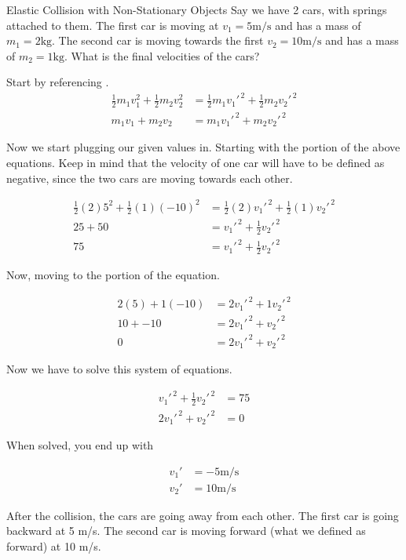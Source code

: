 \begin{example}[]{Elastic Collision with Non-Stationary Objects}
  Say we have 2 cars, with springs attached to them.
  The first car is moving at $v_{1} = 5 \si{\meter / \second}$ and has a mass of $m_{1} = 2 \si{\kilo \gram}$.
  The second car is moving towards the first $v_{2} = 10 \si{\meter / \second}$ and has a mass of $m_{2} = 1 \si{\kilo \gram}$.
  What is the final velocities of the cars?

  \tcblower

  Start by referencing .
  \begin{align*}
    \frac{1}{2} m_{1} v_{1}^{2} + \frac{1}{2} m_{2} v_{2}^{2} &= \frac{1}{2} m_{1} v_{1}'^{\,2} + \frac{1}{2} m_{2} v_{2}'^{\,2} \\
    m_{1} v_{1} + m_{2} v_{2} &= m_{1} v_{1}'^{\,2} + m_{2} v_{2}'^{\,2}
  \end{align*}

  Now we start plugging our given values in.
  Starting with the  portion of the above equations.
  Keep in mind that the velocity of one car will have to be defined as negative, since the two cars are moving towards each other.

  \begin{align*}
    \frac{1}{2} (2) 5^{2} + \frac{1}{2} (1) (-10)^{2} &= \frac{1}{2} (2) v_{1}'^{\,2} + \frac{1}{2} (1) v_{2}'^{\,2} \\
    25 + 50 &= v_{1}'^{\,2} + \frac{1}{2} v_{2}'^{\,2} \\
    75 &= v_{1}'^{\,2} + \frac{1}{2} v_{2}'^{\,2}
  \end{align*}

  Now, moving to the  portion of the equation.

  \begin{align*}
    2 (5) + 1 (-10) &= 2 v_{1}'^{\,2} + 1 v_{2}'^{\,2} \\
    10 + -10 &= 2 v_{1}'^{\,2} + v_{2}'^{\,2} \\
    0 &= 2 v_{1}'^{\,2} + v_{2}'^{\,2}
  \end{align*}

  Now we have to solve this system of equations.

  \begin{align*}
    v_{1}'^{\,2} + \frac{1}{2} v_{2}'^{\,2} &= 75 \\
    2 v_{1}'^{\,2} + v_{2}'^{\,2} &= 0
  \end{align*}

  When solved, you end up with

  \begin{align*}
    v_{1}' &= -5 \si{\meter / \second} \\
    v_{2}' &= 10 \si{\meter / \second}
  \end{align*}

  After the collision, the cars are going away from each other. The first car is going backward at 5 \si{\meter / \second}. The second car is moving forward (what we defined as forward) at 10 \si{\meter / \second}.
\end{example}

